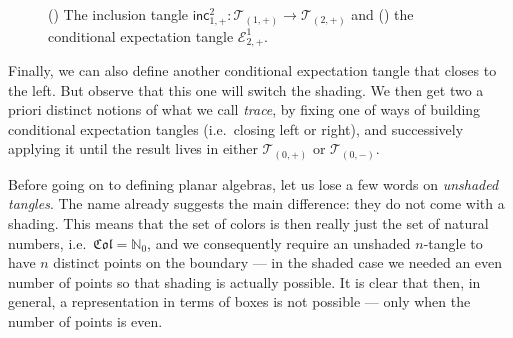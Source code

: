\begin{figure}[!htp]
\begin{subfigure}{0.49\textwidth}
		\caption[]{}
		\label{fig:ConditionalExpectationTangle}
	\end{subfigure}
	
	\caption[Inclusion and conditional expectation tangles]{() The inclusion tangle $\textsf{inc}_{1,+}^{2}:\mathcal{T}_{(1,+)}\rightarrow\mathcal{T}_{(2,+)}$ and
		()	the conditional expectation tangle $\mathcal{E}_{2,+}^{1}$.
	}
\end{figure}

Finally, we can also define another conditional expectation tangle that closes to the left. But observe that this one will switch the shading. We then get two a priori distinct notions of what we call  \emph{trace}, by fixing one of ways of building conditional expectation tangles (i.e.\ closing left or right), and successively applying it until the result lives in either $\mathcal{T}_{(0,+)}$ or $\mathcal{T}_{(0,-)}$.

\bigno\bigno

Before going on to defining planar algebras, let us lose a few words on \emph{unshaded tangles}. The name already suggests the main difference: they do not come with a shading. This means that the set of colors is then really just the set of natural numbers, i.e.\ $\mathfrak{Col} =\mathbb{N}_0$, and we consequently require an unshaded $n$-tangle to have $n$ distinct points on the boundary --- in the shaded case we needed an even number of points so that shading is actually possible. It is clear that then, in general, a representation in terms of boxes is not possible --- only when the number of points is even. 
